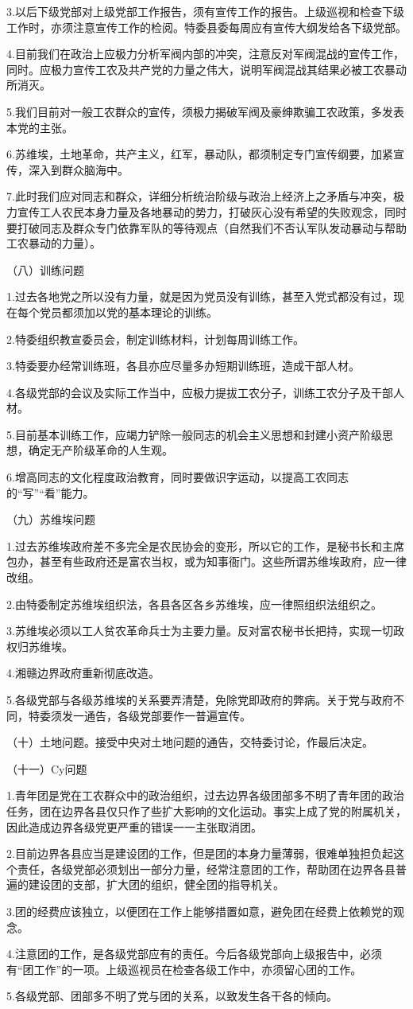 3.以后下级党部对上级党部工作报告，须有宣传工作的报告。上级巡视和检查下级工作时，亦须注意宣传工作的检阅。特委县委每周应有宣传大纲发给各下级党部。

4.目前我们在政治上应极力分析军阀内部的冲突，注意反对军阀混战的宣传工作，同时。应极力宣传工农及共产党的力量之伟大，说明军阀混战其结果必被工农暴动所消灭。

5.我们目前对一般工农群众的宣传，须极力揭破军阀及豪绅欺骗工农政策，多发表本党的主张。

6.苏维埃，土地革命，共产主义，红军，暴动队，都须制定专门宣传纲要，加紧宣传，深入到群众脑海中。

7.此时我们应对同志和群众，详细分析统治阶级与政治上经济上之矛盾与冲突，极力宣传工人农民本身力量及各地暴动的势力，打破灰心没有希望的失败观念，同时要打破同志及群众专门依靠军队的等待观点（自然我们不否认军队发动暴动与帮助工农暴动的力量）。

（八）训练问题

1.过去各地党之所以没有力量，就是因为党员没有训练，甚至入党式都没有过，现在每个党员都须加以党的基本理论的训练。

2.特委组织教宣委员会，制定训练材料，计划每周训练工作。

3.特委要办经常训练班，各县亦应尽量多办短期训练班，造成干部人材。

4.各级党部的会议及实际工作当中，应极力提拔工农分子，训练工农分子及干部人材。

5.目前基本训练工作，应竭力铲除一般同志的机会主义思想和封建小资产阶级思想，确定无产阶级革命的人生观。

6.增高同志的文化程度政治教育，同时要做识字运动，以提高工农同志的“写”“看”能力。

（九）苏维埃问题

1.过去苏维埃政府差不多完全是农民协会的变形，所以它的工作，是秘书长和主席包办，甚至有些政府还是富农当权，或为知事衙门。这些所谓苏维埃政府，应一律改组。

2.由特委制定苏维埃组织法，各县各区各乡苏维埃，应一律照组织法组织之。

3.苏维埃必须以工人贫农革命兵士为主要力量。反对富农秘书长把持，实现一切政权归苏维埃。

4.湘赣边界政府重新彻底改造。

5.各级党部与各级苏维埃的关系要弄清楚，免除党即政府的弊病。关于党与政府不同，特委须发一通告，各级党部要作一普遍宣传。

（十）土地问题。接受中央对土地问题的通告，交特委讨论，作最后决定。

（十一）Cy问题

1.青年团是党在工农群众中的政治组织，过去边界各级团部多不明了青年团的政治任务，团在边界各县仅只作了些扩大影响的文化运动。事实上成了党的附属机关，因此造成边界各级党更严重的错误一一主张取消团。

2.目前边界各县应当是建设团的工作，但是团的本身力量薄弱，很难单独担负起这个责任，各级党部必须划出一部分力量，经常注意团的工作，帮助团在边界各县普遍的建设团的支部，扩大团的组织，健全团的指导机关。

3.团的经费应该独立，以便团在工作上能够措置如意，避免团在经费上依赖党的观念。

4.注意团的工作，是各级党部应有的责任。今后各级党部向上级报告中，必须有“团工作”的一项。上级巡视员在检查各级工作中，亦须留心团的工作。

5.各级党部、团部多不明了党与团的关系，以致发生各干各的倾向。


